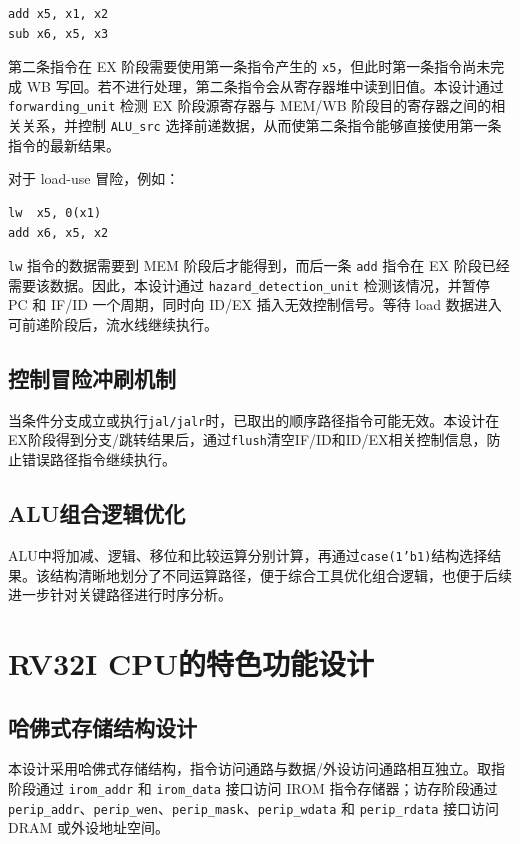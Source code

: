 \documentclass[UTF8,a4paper,12pt]{ctexart}
\newcommand{\code}[1]{\texttt{#1}}
\begin{document}
\begin{verbatim}
add x5, x1, x2
sub x6, x5, x3
\end{verbatim}

第二条指令在 EX 阶段需要使用第一条指令产生的 \code{x5}，但此时第一条指令尚未完成 WB 写回。若不进行处理，第二条指令会从寄存器堆中读到旧值。本设计通过 \code{forwarding\_unit} 检测 EX 阶段源寄存器与 MEM/WB 阶段目的寄存器之间的相关关系，并控制 \code{ALU\_src} 选择前递数据，从而使第二条指令能够直接使用第一条指令的最新结果。

对于 load-use 冒险，例如：

\begin{verbatim}
lw  x5, 0(x1)
add x6, x5, x2
\end{verbatim}

\code{lw} 指令的数据需要到 MEM 阶段后才能得到，而后一条 \code{add} 指令在 EX 阶段已经需要该数据。因此，本设计通过 \code{hazard\_detection\_unit} 检测该情况，并暂停 PC 和 IF/ID 一个周期，同时向 ID/EX 插入无效控制信号。等待 load 数据进入可前递阶段后，流水线继续执行。


\subsection{控制冒险冲刷机制}

当条件分支成立或执行\code{jal/jalr}时，已取出的顺序路径指令可能无效。本设计在EX阶段得到分支/跳转结果后，通过\code{flush}清空IF/ID和ID/EX相关控制信息，防止错误路径指令继续执行。

\subsection{ALU组合逻辑优化}

ALU中将加减、逻辑、移位和比较运算分别计算，再通过\code{case(1'b1)}结构选择结果。该结构清晰地划分了不同运算路径，便于综合工具优化组合逻辑，也便于后续进一步针对关键路径进行时序分析。


\section{RV32I CPU的特色功能设计}

\subsection{哈佛式存储结构设计}

本设计采用哈佛式存储结构，指令访问通路与数据/外设访问通路相互独立。取指阶段通过 \code{irom\_addr} 和 \code{irom\_data} 接口访问 IROM 指令存储器；访存阶段通过 \code{perip\_addr}、\code{perip\_wen}、\code{perip\_mask}、\code{perip\_wdata} 和 \code{perip\_rdata} 接口访问 DRAM 或外设地址空间。
\end{document}
